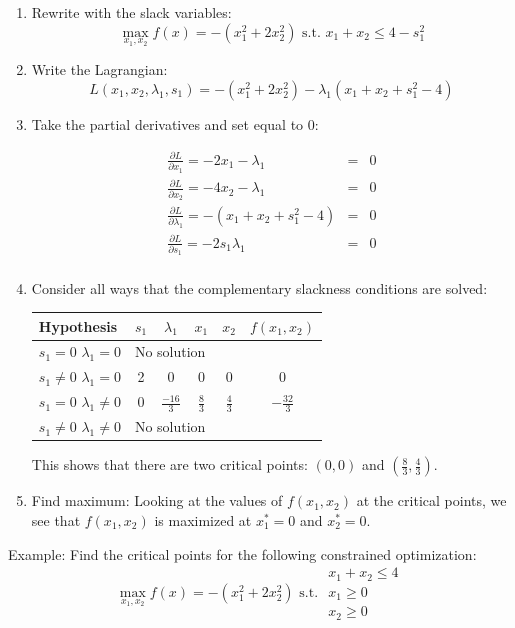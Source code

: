 \documentclass[]{book}
\theoremstyle{definition}
\theoremstyle{definition}
\theoremstyle{definition}
\theoremstyle{remark}
\begin{document}
\begin{enumerate}
\item Rewrite with the slack variables:
$$\max_{x_1,x_2} f(x) = -(x_1^2 + 2x_2^2) \text{ s.t. } x_1 + x_2 \le 4 - s_1^2$$

\item Write the Lagrangian:
$$L(x_1,x_2,\lambda_1,s_1) = -(x_1^2 + 2x_2^2) - \lambda_1 (x_1 + x_2 + s_1^2 - 4)$$

\item Take the partial derivatives and set equal to 0:

\begin{eqnarray*}
\frac{\partial L}{\partial x_1} = -2x_1 - \lambda_1  & = & 0\\
\frac{\partial L}{\partial x_2}  = -4x_2 - \lambda_1 & =  & 0\\
\frac{\partial L}{\partial \lambda_1} = -(x_1 + x_2 + s_1^2 - 4)& = & 0\\
\frac{\partial L}{\partial s_1} = -2s_1\lambda_1 & = & 0\\
\end{eqnarray*}

\item Consider all ways that the complementary slackness conditions are solved:
\begin{center}
\begin{tabular}{|l|cccc|c|}
\hline
Hypothesis & $s_1$ & $\lambda_1$ & $x_1$ & $x_2$ & $f(x_1, x_2)$\\
\hline
$s_1 = 0$ $\lambda_1 = 0$ & \multicolumn{4}{l|}{No solution} & \\
$s_1 \neq 0$ $\lambda_1 = 0$ & 2 & 0 & 0 & 0  & 0\\
$s_1 = 0$ $\lambda_1 \neq 0$ & 0 & $\frac{-16}{3}$ & $\frac{8}{3}$ & $\frac{4}{3}$ & $-\frac{32}{3}$\\
$s_1 \neq 0$ $\lambda_1 \neq 0$ & \multicolumn{4}{l|}{No solution} &\\
\hline
\end{tabular}
\end{center}

This shows that there are two critical points: $(0,0)$ and $(\frac{8}{3},\frac{4}{3})$.

\item Find maximum:
Looking at the values of $f(x_1,x_2)$ at the critical points, we see that $f(x_1,x_2)$ is maximized at $x_1^* = 0$ and $x_2^*=0$.

\end{enumerate}

Example: Find the critical points for the following constrained
optimization: \[\max_{x_1,x_2} f(x) = -(x_1^2 + 2x_2^2) \text{ s.t. } 
\begin{array}{l}
x_1 + x_2 \le 4\\
x_1 \ge 0\\
x_2 \ge 0
\end{array}\]
\end{document}
